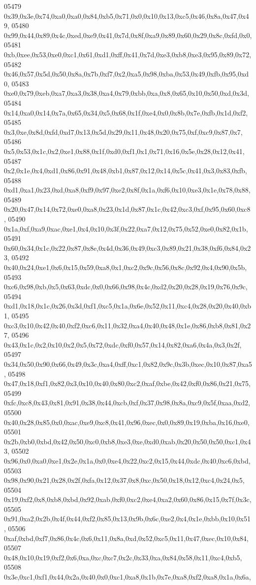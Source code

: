 \begin{DoxyCode}
05479   0x39,0x3e,0x74,0xa0,0xa0,0x84,0xb5,0x71,0x0,0x10,0x13,0xc5,0x46,0x8a,0x47,0x49,
05480   0x99,0x44,0x89,0x4c,0xed,0xe9,0x41,0x7d,0x8f,0xa9,0x89,0x60,0x29,0x8c,0xfd,0x0,
05481   0xb,0xee,0x53,0xe0,0xc1,0x61,0xd1,0xff,0x41,0x7d,0xe3,0xb8,0xe3,0x95,0x89,0x72,
05482   0x46,0x57,0x5d,0x50,0x8a,0x7b,0xf7,0x2,0xa5,0x98,0xba,0x53,0x49,0xfb,0x95,0xd0,
05483   0xe0,0x79,0xeb,0xa7,0xa3,0x38,0xa4,0x79,0xbb,0xa,0x8,0x65,0x10,0x50,0xd,0x3d,
05484   0x14,0xa0,0x14,0x7a,0x65,0x34,0x5,0x68,0x1f,0xe4,0x0,0x8b,0x7e,0xfb,0x1d,0xf2,
05485   0x3,0xe,0x8d,0xfd,0xd7,0x13,0x5d,0x29,0x11,0x48,0x20,0x75,0xf,0xc9,0x87,0x7,
05486   0x5,0x53,0x1c,0x2,0xe1,0x88,0x1f,0xd0,0xf1,0x1,0x71,0x16,0x5e,0x28,0x12,0x41,
05487   0x2,0x1e,0x4,0xd1,0x86,0x91,0x48,0xb1,0x87,0x12,0x14,0x5c,0x41,0x3,0x83,0xfb,
05488   0xd1,0xa1,0x23,0xd,0xa8,0xf9,0x97,0xe2,0x8f,0x1a,0xf6,0x10,0xe3,0x1e,0x78,0x88,
05489   0x20,0x47,0x14,0x72,0xe0,0xa8,0x23,0x1d,0x87,0x1c,0x42,0xc3,0xf,0x95,0x60,0xc8,
05490   0x1a,0xf,0xa9,0xac,0xe1,0x4,0x10,0x3f,0x22,0xa7,0x12,0x75,0x52,0xe0,0x82,0x1b,
05491   0x60,0x34,0x1c,0x22,0x87,0x8e,0x4d,0x36,0x49,0xc3,0x89,0x21,0x38,0xf6,0x84,0x23,
05492   0x40,0x24,0xe1,0x6,0x15,0x59,0xa8,0x1,0xc2,0x9c,0x56,0x8c,0x92,0x4,0x90,0x5b,
05493   0xc6,0x98,0xb,0x5,0x63,0xdc,0x0,0x66,0x98,0x4c,0xd2,0x20,0x28,0x19,0x76,0x9c,
05494   0xd1,0x18,0x1c,0x26,0x3d,0xf1,0xc5,0x1a,0x6e,0x52,0x11,0xc4,0x28,0x20,0x40,0xb1,
05495   0xc3,0x10,0x42,0x40,0xf2,0xc6,0x11,0x32,0xa4,0x40,0x48,0x1e,0x86,0xb8,0x81,0x27,
05496   0x43,0x1c,0x2,0x10,0x2,0x5,0x72,0xdc,0xf0,0x57,0x14,0x82,0xa6,0x4a,0x3,0x2f,
05497   0x34,0x50,0x90,0x66,0x49,0x3c,0xa4,0xff,0xc1,0x82,0x9c,0x3b,0xec,0x10,0x87,0xa5,
05498   0x47,0x18,0xf1,0x82,0x3,0x10,0x40,0x80,0xc2,0xaf,0xbe,0x42,0xf0,0x86,0x21,0x75,
05499   0xfc,0xc8,0x43,0x81,0x91,0x38,0x44,0xcb,0xf,0x37,0x98,0x8a,0xc9,0x5f,0xaa,0xd2,
05500   0x40,0x28,0x85,0x0,0xac,0xe9,0xc8,0x41,0x96,0xec,0x0,0x89,0x19,0xba,0x16,0xe0,
05501   0x2b,0xb0,0xbd,0x42,0x50,0xc0,0xb8,0xe3,0xe,0xd0,0xab,0x20,0x50,0x50,0xc1,0x43,
05502   0x96,0x0,0xa0,0xe1,0x2e,0x1a,0x0,0xe4,0x22,0xc2,0x15,0x44,0xdc,0x40,0xc6,0xbd,
05503   0x98,0x90,0x21,0x28,0x2f,0xfa,0x12,0x37,0x8,0xc,0x50,0x18,0x12,0xc4,0x24,0x5,
05504   0x19,0xf2,0x8,0xb8,0xbd,0x92,0xab,0xf0,0xc2,0xe4,0xa2,0x60,0x86,0x15,0x7f,0x3c,
05505   0x91,0xa2,0x2b,0x4f,0x44,0xf2,0x85,0x13,0x9b,0x6c,0xe2,0x4,0x1e,0xbb,0x10,0x51,
05506   0xaf,0xbd,0xf7,0x86,0x4c,0x6,0x11,0x8a,0xd,0x52,0xc5,0x11,0x47,0xec,0x10,0x84,
05507   0x48,0x10,0x19,0xf2,0x6,0xa,0xc,0xc7,0x2c,0x33,0xa,0x84,0x58,0x11,0xc4,0xb5,
05508   0x3e,0xc1,0xf1,0x44,0x2a,0x40,0x0,0xc1,0xa8,0x1b,0x7e,0xa8,0xf2,0xa8,0x1a,0x6a,

\end{DoxyCode}
